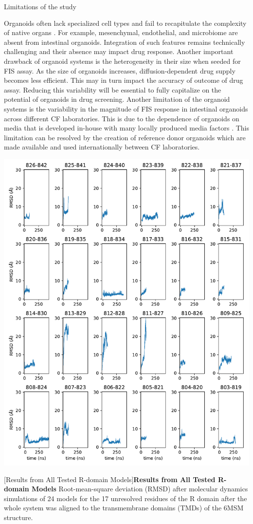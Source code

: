 Limitations of the study

Organoids often lack specialized cell types and fail to recapitulate the complexity of native organs \cite{clevers2016}. For example, mesenchymal, endothelial, and microbiome are absent from intestinal organoids. Integration of such features remains technically challenging and their absence may impact drug response. Another important drawback of organoid systems is the heterogeneity in their size when seeded for FIS assay. As the size of organoids increases, diffusion-dependent drug supply becomes less efficient. This may in turn impact the accuracy of outcome of drug assay. Reducing this variability will be essential to fully capitalize on the potential of organoids in drug screening. Another limitation of the organoid systems is the variability in the magnitude of FIS response in intestinal organoids across different CF laboratories. This is due to the dependence of organoids on media that is developed in-house with many locally produced media factors \cite{dekkers2016,ramalho2021}. This limitation can be resolved by the creation of reference donor organoids which are made available and used internationally between CF laboratories.


\begin{center}
	\includegraphics[width=\textwidth]{figures/I37R/Figure_S6.pdf}
\label{I37R_S6}
\end{center}
\begingroup
{}[Results from All Tested R-domain Models]{\textbf{Results from All Tested R-domain Models}}{
Root-mean-square deviation (RMSD) after molecular dynamics simulations of 24 models for the 17 unresolved residues of the R domain after the whole system was aligned to the transmembrane domains (TMDs) of the 6MSM structure.
}
\endgroup

